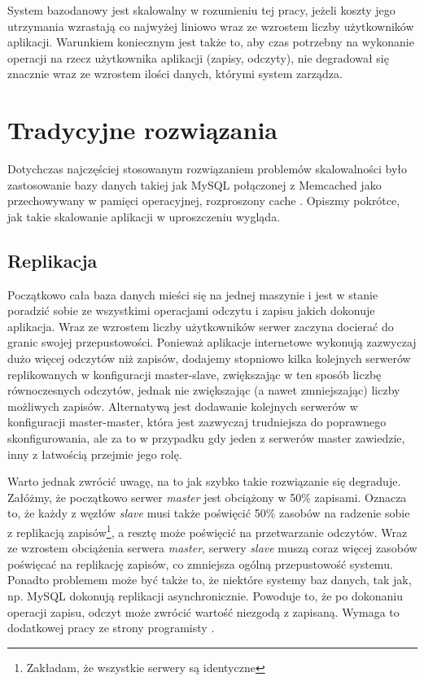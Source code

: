 System bazodanowy jest skalowalny w rozumieniu tej pracy, jeżeli koszty jego utrzymania wzrastają co najwyżej liniowo wraz ze wzrostem liczby użytkowników aplikacji. 
Warunkiem koniecznym jest także to, aby czas potrzebny na wykonanie operacji na rzecz użytkownika aplikacji (zapisy, odczyty), nie degradował się znacznie wraz ze wzrostem ilości danych, którymi system zarządza.

\section{Tradycyjne rozwiązania}
Dotychczas najczęściej stosowanym rozwiązaniem problemów skalowalności było zastosowanie bazy danych takiej jak MySQL połączonej z Memcached jako przechowywany w pamięci operacyjnej, rozproszony cache \cite{highscalability-mysql-end-of-an-era}.
Opiszmy pokrótce, jak takie skalowanie aplikacji w uproszczeniu wygląda.

\subsection{Replikacja}
Początkowo cała baza danych mieści się na jednej maszynie i jest w stanie poradzić sobie ze wszystkimi operacjami odczytu i zapisu jakich dokonuje aplikacja.
Wraz ze wzrostem liczby użytkowników serwer zaczyna docierać do granic swojej przepustowości. 
Ponieważ aplikacje internetowe wykonują zazwyczaj dużo więcej odczytów niż zapisów, dodajemy stopniowo kilka kolejnych serwerów replikowanych w konfiguracji master-slave, zwiększając w ten sposób liczbę równoczesnych odczytów, jednak nie zwiększając (a nawet zmniejszając) liczby możliwych zapisów.
Alternatywą jest dodawanie kolejnych serwerów w konfiguracji master-master, która jest zazwyczaj trudniejsza do poprawnego skonfigurowania, ale za to w przypadku gdy jeden z serwerów master zawiedzie, inny z łatwością przejmie jego rolę.


Warto jednak zwrócić uwagę, na to jak szybko takie rozwiązanie się degraduje.
Załóżmy, że początkowo serwer \emph{master} jest obciążony w 50\% zapisami.
Oznacza to, że każdy z węzłów \emph{slave} musi także poświęcić 50\% zasobów na radzenie sobie z replikacją zapisów\footnote{Zakładam, że wszystkie serwery są identyczne}, a resztę może poświęcić na przetwarzanie odczytów.
Wraz ze wzrostem obciążenia serwera \emph{master}, serwery \emph{slave} muszą coraz więcej zasobów poświęcać na replikację zapisów, co zmniejsza ogólną przepustowość systemu.
Ponadto problemem może być także to, że niektóre systemy baz danych, tak jak, np. MySQL dokonują replikacji asynchronicznie.
Powoduje to, że po dokonaniu operacji zapisu, odczyt może zwrócić wartość niezgodą z zapisaną.
Wymaga to dodatkowej pracy ze strony programisty \cite{zaitsev-scaling-mysql}.

